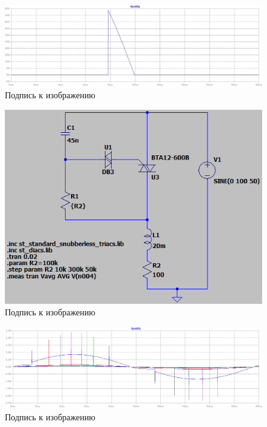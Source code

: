\documentclass[a4paper, 12pt]{article}
\begin{document}
    \begin{figure}[H]
        \centering
        \includegraphics[scale=0.45]{R2-300k.png}
        \captionsetup{skip=0pt}
        \caption{Подпись к изображению}
        \label{fig:R2-300k}
    \end{figure}


    \begin{figure}[H]
        \centering
        \includegraphics[scale=0.8]{scheme5.png}
        \captionsetup{skip=0pt}
        \caption{Подпись к изображению}
        \label{fig:scheme5}
    \end{figure}


    \begin{figure}[H]
        \centering
        \includegraphics[scale=0.45]{R2-all_L20m.png}
        \captionsetup{skip=0pt}
        \caption{Подпись к изображению}
        \label{fig:R2-all_L20m}
    \end{figure}
\end{document}
